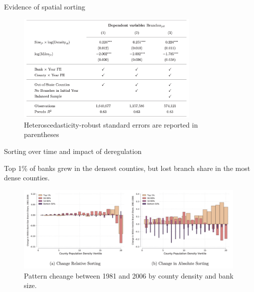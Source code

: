 \documentclass[notes,10pt, aspectratio=169]{beamer}
\newenvironment{wideitemize}{\itemize\addtolength{\itemsep}{10pt}}{\enditemize}
\begin{document}
    \begin{frame}{Evidence of spatial sorting}
    
        \begin{figure}
            \centering
            \includegraphics[width=0.78\textwidth]{imgs/tab2.png}
            \caption*{Heteroscedasticity-robust standard
            errors are reported in parentheses}
            \label{fig:my_label}
        \end{figure}
        
        \end{frame}


        \begin{frame}{Sorting over time and impact of deregulation}
            \begin{wideitemize}
                \item Top 1\% of banks grew in the densest counties, but lost branch share in the most dense counties. 
        \end{wideitemize}

    \begin{figure}
        \centering
        \includegraphics[width=0.99\textwidth]{imgs/fig9.png}
        \caption*{
            Pattern cheange between 1981 and 2006 by county density and bank size. }
        \label{fig:my_label}
    \end{figure}

    
    \end{frame}
\end{document}
